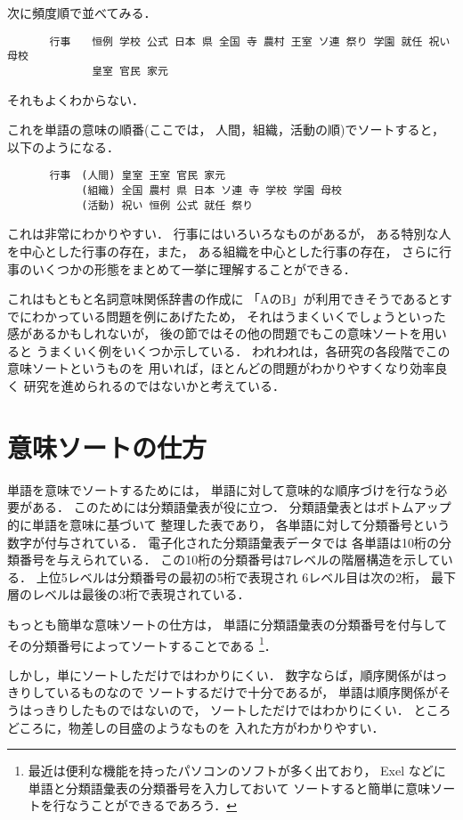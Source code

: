 次に頻度順で並べてみる．
{\small
\begin{verbatim}
　　　　行事　　恒例 学校 公式 日本 県 全国 寺 農村 王室 ソ連 祭り 学園 就任 祝い 母校 
　　　　　　　　皇室 官民 家元
\end{verbatim}
}
それもよくわからない．

これを単語の意味の順番(ここでは，
人間，組織，活動の順)でソートすると，以下のようになる．
{\small
\begin{verbatim}
　　　　行事　(人間) 皇室 王室 官民 家元 
　　　　　　　(組織) 全国 農村 県 日本 ソ連 寺 学校 学園 母校 
　　　　　　　(活動) 祝い 恒例 公式 就任 祭り
\end{verbatim}
}
これは非常にわかりやすい．
行事にはいろいろなものがあるが，
ある特別な人を中心とした行事の存在，また，
ある組織を中心とした行事の存在，
さらに行事のいくつかの形態をまとめて一挙に理解することができる．

これはもともと名詞意味関係辞書の作成に
「AのB」が利用できそうであるとすでにわかっている問題を例にあげたため，
それはうまくいくでしょうといった感があるかもしれないが，
後の節ではその他の問題でもこの意味ソートを用いると
うまくいく例をいくつか示している．
われわれは，各研究の各段階でこの意味ソートというものを
用いれば，ほとんどの問題がわかりやすくなり効率良く
研究を進められるのではないかと考えている．

\section{意味ソートの仕方}

単語を意味でソートするためには，
単語に対して意味的な順序づけを行なう必要がある．
このためには分類語彙表\cite{bgh}が役に立つ．
分類語彙表とはボトムアップ的に単語を意味に基づいて
整理した表であり，
各単語に対して分類番号という数字が付与されている．
電子化された分類語彙表データでは
各単語は10桁の分類番号を与えられている．
この10桁の分類番号は7レベルの階層構造を示している．
上位5レベルは分類番号の最初の5桁で表現され
6レベル目は次の2桁，
最下層のレベルは最後の3桁で表現されている．

もっとも簡単な意味ソートの仕方は，
単語に分類語彙表の分類番号を付与して
その分類番号によってソートすることである
\footnote{
最近は便利な機能を持ったパソコンのソフトが多く出ており，
Exel などに単語と分類語彙表の分類番号を入力しておいて
ソートすると簡単に意味ソートを行なうことができるであろう．}．

しかし，単にソートしただけではわかりにくい．
数字ならば，順序関係がはっきりしているものなので
ソートするだけで十分であるが，
単語は順序関係がそうはっきりしたものではないので，
ソートしただけではわかりにくい．
ところどころに，物差しの目盛のようなものを
入れた方がわかりやすい．

